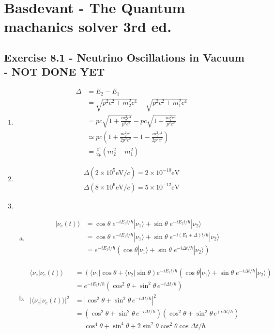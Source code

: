 \documentclass[../main.tex]{subfiles}
\begin{document}
\section{{\sc Basdevant} - The Quantum machanics solver 3rd ed.}
\subsection{Exercise 8.1 - Neutrino Oscillations in Vacuum - NOT DONE YET}
\begin{enumerate}
\item
\begin{align}
\Delta
&=E_2-E_1\\
&=\sqrt{p^2c^2+m_2^2c^4}-\sqrt{p^2c^2+m_1^2c^4}\\
&=pc\sqrt{1+\frac{m_2^2c^4}{p^2c^2}}-pc\sqrt{1+\frac{m_1^2c^4}{p^2c^2}}\\
&\simeq pc\left(1+\frac{m_2^2c^4}{2p^2c^2}-1-\frac{m_1^2c^4}{2p^2c^2}\right)\\
&=\frac{c^3}{2p}(m_2^2-m_1^2)
\end{align}

\item 
\begin{align}
\Delta(2\times10^5\text{eV}/c)=2\times10^{-10}\text{eV}\\
\Delta(8\times10^6\text{eV}/c)=5\times10^{-12}\text{eV}
\end{align}
\item
\begin{enumerate}[(a)]
\item 
\begin{align}
|\nu_e(t)\rangle
&=\cos\theta\;e^{-iE_1t/\hbar}|\nu_1\rangle+\sin\theta\;e^{-iE_2t/\hbar}|\nu_2\rangle\\
&=\cos\theta\;e^{-iE_1t/\hbar}|\nu_1\rangle+\sin\theta\;e^{-i(E_1+\Delta)t/\hbar}|\nu_2\rangle\\
&=e^{-iE_1t/\hbar}\left(\cos\theta|\nu_1\rangle+\sin\theta\;e^{-i\Delta t/\hbar}|\nu_2\rangle\right)\\
\end{align}

\item 
\begin{align}
\langle\nu_e|\nu_e(t)\rangle
&=(\langle\nu_1|\cos\theta+\langle\nu_2|\sin\theta)e^{-iE_1t/\hbar}\left(\cos\theta|\nu_1\rangle+\sin\theta\;e^{-i\Delta t/\hbar}|\nu_2\rangle\right)\\
&=e^{-iE_1t/\hbar}(\cos^2\theta+\sin^2\theta\,e^{-i\Delta t/\hbar})\\
|\langle\nu_e|\nu_e(t)\rangle|^2
&=|\cos^2\theta+\sin^2\theta\,e^{-i\Delta t/\hbar}|^2\\
&=(\cos^2\theta+\sin^2\theta\,e^{-i\Delta t/\hbar})(\cos^2\theta+\sin^2\theta\,e^{+i\Delta t/\hbar})\\
&=\cos^4\theta+\sin^4\theta+2\sin^2\theta\cos^2\theta\cos\Delta t/\hbar
\end{align}


\end{enumerate}
\end{enumerate}
\end{document}

